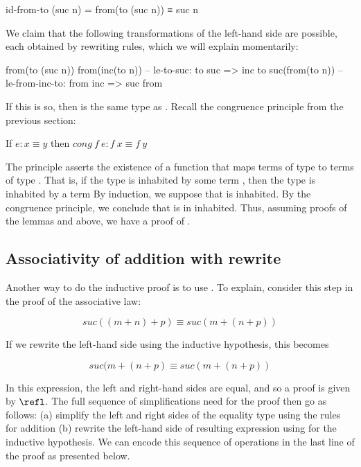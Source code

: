 \begin{colored}[elm]
id-from-to (suc n) = from(to (suc n)) ≡ suc n
\end{colored}

We claim that the following transformations of the left-hand side are possible, each obtained by rewriting rules, which we will explain momentarily:

\begin{colored}[elm]
from(to (suc n))
from(inc(to n))  -- le-to-suc: to suc => inc to
suc(from(to n))  -- le-from-inc-to: from inc => suc from
\end{colored}

If this is so, then  is the same type as .  Recall the congruence principle from the previous section:

\begin{indent}
If $e : x \equiv y$ then $cong\ f\ e: f\ x \equiv f\ y$
\end{indent}

The principle asserts the existence of a function  that maps terms of type   to terms of type .   That is, if the type   is inhabited by some term , then the type  is inhabited by a term 
By induction, we suppose that  is inhabited.  By the congruence principle, we conclude that  is in inhabited. Thus, assuming proofs of the lemmas  and above, we have a proof of .



\subsection{Associativity of addition with rewrite}


Another way to do the inductive proof is to use .  To explain, consider this step in the proof of the associative law:

$$
 suc ((m + n) + p) \equiv suc (m + (n + p))
$$

 If we rewrite the left-hand side using the inductive hypothesis, this becomes

\begin{equation}
suc (m + (n + p) \equiv suc (m + (n + p))
\end{equation}

In this expression, the left and right-hand sides are equal, and so a proof is given by $\refl$. 
The full sequence of simplifications need for the proof then go as follows: (a) simplify the left and right sides of the equality type using the rules for addition (b) rewrite the left-hand side of resulting expression using  for the inductive hypothesis. We can encode this sequence of operations in the last line of the proof as presented below.  

